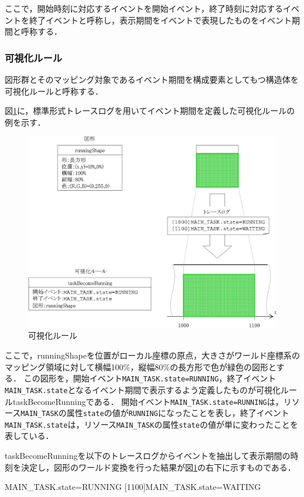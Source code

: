 ここで，開始時刻に対応するイベントを開始イベント，終了時刻に対応するイベントを終了イベントと呼称し，表示期間をイベントで表現したものをイベント期間と呼称する．

\subsubsection{可視化ルール}
図形群とそのマッピング対象であるイベント期間を構成要素としてもつ構造体を可視化ルールと呼称する．

図\ref{fig:timeShape}に，標準形式トレースログを用いてイベント期間を定義した可視化ルールの例を示す．

\begin{figure}[h]
\begin{center}
\includegraphics[scale=0.9]{img/timeShape.eps}
\caption{可視化ルール}
\label{fig:timeShape}
\end{center}
\end{figure}

ここで，runningShapeを位置がローカル座標の原点，大きさがワールド座標系のマッピング領域に対して横幅100\%，縦幅80\%の長方形で色が緑色の図形とする．
この図形を，開始イベント\verb|MAIN_TASK.state=RUNNING|，終了イベント\verb|MAIN_TASK.state|となるイベント期間で表示するよう定義したものが可視化ルールtaskBecomeRunningである．
開始イベント\verb|MAIN_TASK.state=RUNNING|は，リソース\verb|MAIN_TASK|の属性\verb|state|の値が\verb|RUNNING|になったことを表し，終了イベント\verb|MAIN_TASK.state|は，リソース\verb|MAIN_TASK|の属性\verb|state|の値が単に変わったことを表している．

taskBecomeRunningを以下のトレースログからイベントを抽出して表示期間の時刻を決定し，図形のワールド変換を行った結果が図\ref{fig:timeShape}の右下に示すものである．

\begin{FileNoTitle}
[1000]MAIN_TASK.state=RUNNING
[1100]MAIN_TASK.state=WAITING
\end{FileNoTitle}
